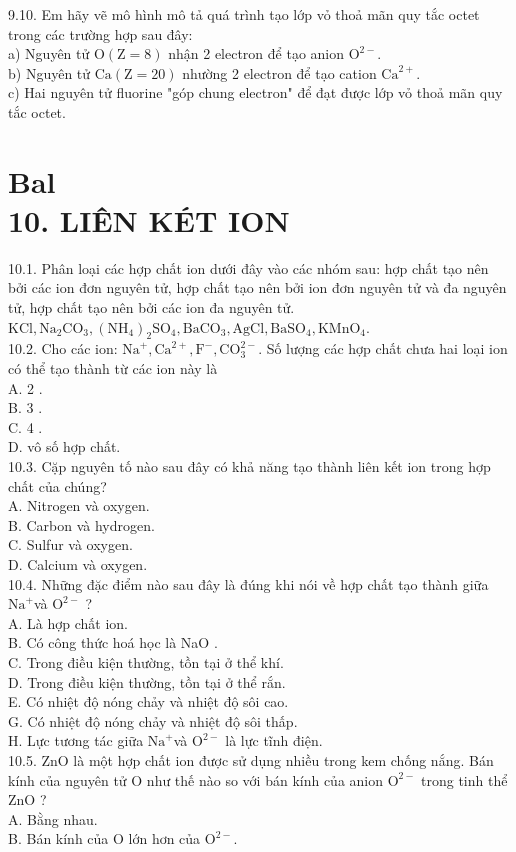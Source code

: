 \documentclass[10pt]{article}
\begin{document}
\begin{enumerate}
9.10. Em hãy vẽ mô hình mô tả quá trình tạo lớp vỏ thoả mãn quy tắc octet trong các trường hợp sau đây:\\
a) Nguyên tử $\mathrm{O}(\mathrm{Z}=8)$ nhận 2 electron để tạo anion $\mathrm{O}^{2-}$.\\
b) Nguyên tử $\mathrm{Ca}(\mathrm{Z}=20)$ nhường 2 electron để tạo cation $\mathrm{Ca}^{2+}$.\\
c) Hai nguyên tử fluorine "góp chung electron" để đạt được lớp vỏ thoả mãn quy tắc octet.
\end{enumerate}

\section*{Bal \\
 10. LIÊN KÉT ION}
10.1. Phân loại các hợp chất ion dưới đây vào các nhóm sau: hợp chất tạo nên bởi các ion đơn nguyên tử, hợp chất tạo nên bởi ion đơn nguyên tử và đa nguyên tử, hợp chất tạo nên bởi các ion đa nguyên tử.\\
$\mathrm{KCl}, \mathrm{Na}_{2} \mathrm{CO}_{3},\left(\mathrm{NH}_{4}\right)_{2} \mathrm{SO}_{4}, \mathrm{BaCO}_{3}, \mathrm{AgCl}, \mathrm{BaSO}_{4}, \mathrm{KMnO}_{4}$.\\
10.2. Cho các ion: $\mathrm{Na}^{+}, \mathrm{Ca}^{2+}, \mathrm{F}^{-}, \mathrm{CO}_{3}^{2-}$. Số lượng các hợp chất chưa hai loại ion có thể tạo thành từ các ion này là\\
A. 2 .\\
B. 3 .\\
C. 4 .\\
D. vô số hợp chất.\\
10.3. Cặp nguyên tố nào sau đây có khả năng tạo thành liên kết ion trong hợp chất của chúng?\\
A. Nitrogen và oxygen.\\
B. Carbon và hydrogen.\\
C. Sulfur và oxygen.\\
D. Calcium và oxygen.\\
10.4. Những đặc điểm nào sau đây là đúng khi nói về hợp chất tạo thành giữa $\mathrm{Na}^{+}$và $\mathrm{O}^{2-}$ ?\\
A. Là hợp chất ion.\\
B. Có công thức hoá học là NaO .\\
C. Trong điều kiện thường, tồn tại ở thể khí.\\
D. Trong điều kiện thường, tồn tại ở thể rắn.\\
E. Có nhiệt độ nóng chảy và nhiệt độ sôi cao.\\
G. Có nhiệt độ nóng chảy và nhiệt độ sôi thấp.\\
H. Lực tương tác giữa $\mathrm{Na}^{+}$và $\mathrm{O}^{2-}$ là lực tĩnh điện.\\
10.5. ZnO là một hợp chất ion được sử dụng nhiều trong kem chống nắng. Bán kính của nguyên tử O như thế nào so với bán kính của anion $\mathrm{O}^{2-}$ trong tinh thể ZnO ?\\
A. Bằng nhau.\\
B. Bán kính của O lớn hơn của $\mathrm{O}^{2-}$.
\end{document}
